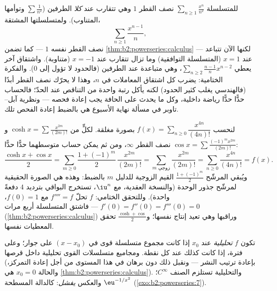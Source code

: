 \begin{example}\label{ex:b2:powerseries:boundaryloss}
للمتسلسلة $\sum_{n\geq1}\frac{x^n}{n^2}$ نصف القطر $1$ وهي
تتقارب عند \emph{كلا} الطرفين ($\sum\frac1{n^2}$ وتوأمها
المتناوب). ولمتسلسلتها المشتقة،
\[
\sum_{n\geq1}\frac{x^{n-1}}{n} ,
\]
نصف القطر نفسه $1$ --- كما تضمن
\cref{thm:b2:powerseries:calculus} --- لكنها الآن
تتباعد عند $x = 1$ (المتسلسلة التوافقية) وما تزال تتقارب
عند $x = -1$ (متناوبة). واشتقاق آخر يعطي
$\sum_{n\geq2}\frac{n-1}{n}x^{n-2}$، وهي متباعدة عند الطرفين
(فالحدود لا تؤول إلى $0$). والفكرة الختامية: يضرب كل
اشتقاق المعاملات في $n$، وهذا لا يحرّك نصف القطر أبدًا
(فالهندسي يغلب كثير الحدود) لكنه يأكل
رتبة واحدة من التناقص عند الحدّ؛ فالحساب حدًّا حدًّا
رياضة داخلية، وكل ما يحدث على الحافة يجب
إعادة فحصه --- ونظرية آبل--تاوبر في مسألة نهاية الأسبوع هي
بالضبط إعادة الفحص تلك.
\end{example}

\begin{example}\label{ex:b2:powerseries:quarter}
لنحسب $f(x) = \sum_{n\geq0} \dfrac{x^{4n}}{(4n)!}$ بصورة
مغلقة. لكلٍّ من $\cosh x = \sum \frac{x^{2m}}{(2m)!}$ و$\cos x =
\sum \frac{(-1)^m x^{2m}}{(2m)!}$ نصف القطر $\infty$، ومن ثم يمكن حساب
متوسطهما حدًّا حدًّا:
\[
\frac{\cosh x + \cos x}{2}
= \sum_{m\geq0}\frac{1 + (-1)^m}{2}\,\frac{x^{2m}}{(2m)!}
= \sum_{m \text{ زوجي}}\frac{x^{2m}}{(2m)!}
= \sum_{n\geq0}\frac{x^{4n}}{(4n)!} = f(x) .
\]
ويُبقي المرشّح $\frac{1+(-1)^m}{2}$ القيم الزوجية للدليل $m$ بالضبط: وهذه
هي الصورة الحقيقية لمرشّح جذور الوحدة (والنسخة العقدية،
مع $\iu^n$، تستخرج البواقي بترديد $4$ دفعةً
واحدة). وللتحقق الختامي: $f$ تحلّ $f'''' = f$ مع $f(0) = 1$،
$f'(0) = f''(0) = f'''(0) = 0$ --- فاشتق المتسلسلة أربع مرات
(\cref{thm:b2:powerseries:calculus}) وراقبها وهي
تعيد إنتاج نفسها؛ و$\frac{\cosh + \cos}{2}$ تحقق المعطيات
نفسها.
\end{example}

\begin{definition}\label{def:b2:powerseries:analytic}
تكون $f$ \emph{تحليلية} عند $x_0$ إذا كانت
مجموع متسلسلة قوى في $(x - x_0)$ على جوار؛ وعلى
فترة، إذا كانت كذلك عند كل نقطة. ومجاميع متسلسلات القوى تحليلية
داخل قرصها (بإعادة ترتيب النشر --- ونقبل ذلك دون برهان في هذا
المستوى من أجل إعادة التمركز، والحالة $x_0 = 0$ هي
\cref{thm:b2:powerseries:calculus}). والتحليلية تستلزم الصنف $C^\infty$؛
والعكس \emph{يفشل}: كالدالة المسطحة $\eu^{-1/x^2}$
(\cref{exo:b2:powerseries:7}).
\end{definition}

